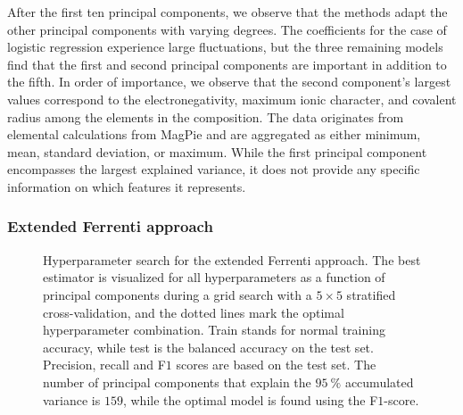 \documentclass[superscriptaddress,unsortedaddress,
 amsmath,amssymb,
 aps,
]{revtex4-2}
\begin{document}
After the first ten principal components, we observe that the methods adapt the other principal components with varying degrees. The coefficients for the case of logistic regression experience large fluctuations, but the three remaining models find that the first and second principal components are important in addition to the fifth. In order of importance, we observe that the second component's largest values correspond to the electronegativity, maximum ionic character, and covalent radius among the elements in the composition. The data originates from elemental calculations from MagPie and are aggregated as either minimum, mean, standard deviation, or maximum. While the first principal component encompasses the largest explained variance, it does not provide any specific information on which features it represents.


\subsubsection*{Extended Ferrenti approach}

\begin{figure}[ht!]
  \begin{subfigure}[b]{1.0\textwidth}
    \centering
    
  \end{subfigure}
\par\bigskip
  \begin{subfigure}[b]{0.5\textwidth}
    
    \caption{}
    \label{fig:q2-LOG}
  \end{subfigure}%
  \hfill
  \begin{subfigure}[b]{0.5\textwidth}
    
    \caption{}
    \label{fig:q2-DT}
  \end{subfigure}

  \begin{subfigure}[b]{0.5\textwidth}
    
    \caption{}
    \label{fig:q2-RF}
  \end{subfigure}%
  \hfill
  \begin{subfigure}[b]{0.5\textwidth}
    
    \caption{}
    \label{fig:q2-GB}
  \end{subfigure}
  \caption{Hyperparameter search for the extended Ferrenti approach. The best estimator is visualized for all hyperparameters as a function of principal components during a grid search with a $5\times5$ stratified cross-validation, and the dotted lines mark the optimal hyperparameter combination. Train stands for normal training accuracy, while test is the balanced accuracy on the test set. Precision, recall and F$1$ scores  are based on the test set. The number of principal components that explain the $95 \ \%$ accumulated variance is $159$, while the optimal model is found using the F$1$-score.}
  \label{fig:02-pca}
\end{figure}
\end{document}
